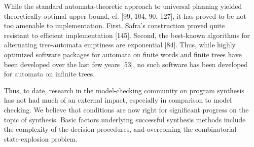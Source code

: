 






While the standard automata-theoretic approach to universal planning yielded theoretically optimal upper bound, cf. [99, 104, 90, 127], it has proved to be not too amenable to implementation. First, Safra’s construction proved quite resistant to efficient implementation [145]. Second, the best-known algorithms for alternating tree-automata emptiness are exponential [84]. Thus, while highly optimized software packages for automata on finite words and finite trees have been developed over the last few years [53], no such software has been developed for automata on infinite trees.

Thus, to date, research in the model-checking community on program synthesis has not had much of an external impact, especially in comparison to model checking. We believe that conditions are now right for significant progress on the topic of synthesis. Basic factors underlying successful synthesis methods include the complexity of the decision procedures, and overcoming the combinatorial state-explosion problem. 

